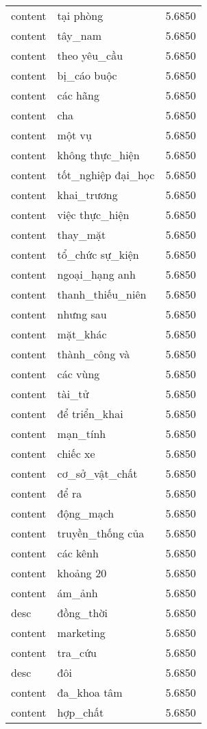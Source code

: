 \documentclass{article}
\begin{document}
\begin{tabular}{lll}
content & tại phòng & 5.6850\\
content & tây\_nam & 5.6850\\
content & theo yêu\_cầu & 5.6850\\
content & bị\_cáo buộc & 5.6850\\
content & các hãng & 5.6850\\
content & cha & 5.6850\\
content & một vụ & 5.6850\\
content & không thực\_hiện & 5.6850\\
content & tốt\_nghiệp đại\_học & 5.6850\\
content & khai\_trương & 5.6850\\
content & việc thực\_hiện & 5.6850\\
content & thay\_mặt & 5.6850\\
content & tổ\_chức sự\_kiện & 5.6850\\
content & ngoại\_hạng anh & 5.6850\\
content & thanh\_thiếu\_niên & 5.6850\\
content & nhưng sau & 5.6850\\
content & mặt\_khác & 5.6850\\
content & thành\_công và & 5.6850\\
content & các vùng & 5.6850\\
content & tài\_tử & 5.6850\\
content & để triển\_khai & 5.6850\\
content & mạn\_tính & 5.6850\\
content & chiếc xe & 5.6850\\
content & cơ\_sở\_vật\_chất & 5.6850\\
content & để ra & 5.6850\\
content & động\_mạch & 5.6850\\
content & truyền\_thống của & 5.6850\\
content & các kênh & 5.6850\\
content & khoảng 20 & 5.6850\\
content & ám\_ảnh & 5.6850\\
desc & đồng\_thời & 5.6850\\
content & marketing & 5.6850\\
content & tra\_cứu & 5.6850\\
desc & đôi & 5.6850\\
content & đa\_khoa tâm & 5.6850\\
content & hợp\_chất & 5.6850\\

\end{tabular}
\end{document}
